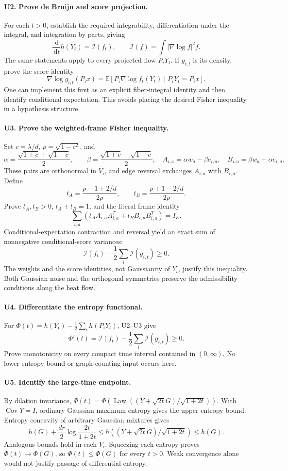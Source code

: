 \documentclass[11pt]{article}
\newcommand{\E}{\mathbb E}
\newcommand{\I}{\mathcal I}
\newcommand{\dd}{\,\mathrm d}
\newcommand{\Law}{\operatorname{Law}}
\newcommand{\Cov}{\operatorname{Cov}}
\begin{document}
\paragraph{U2. Prove de Bruijn and score projection.}
For each $t>0$, establish the required integrability, differentiation
under the integral, and integration by parts, giving
\[
 \frac{\dd}{\dd t}h(Y_t)=\I(f_t),\qquad
 \I(f)=\int|\nabla\log f|^2f.
\]
The same statements apply to every projected flow $P_iY_t$.
If $g_{i,t}$ is its density, prove the score identity
\[
 \nabla\log g_{i,t}(P_ix)
   =\E[P_i\nabla\log f_t(Y_t)\mid P_iY_t=P_ix].
\]
One can implement this first as an explicit fiber-integral identity and
then identify conditional expectation. This avoids placing the desired
Fisher inequality in a hypothesis structure.

\paragraph{U3. Prove the weighted-frame Fisher inequality.}
Set $c=\lambda/d$, $\rho=\sqrt{1-c^2}$, and
\[
 \alpha=\frac{\sqrt{1+c}+\sqrt{1-c}}2,\qquad
 \beta=\frac{\sqrt{1+c}-\sqrt{1-c}}2,
 \quad A_{i,a}=\alpha w_a-\beta e_{i,a},\quad
 B_{i,a}=\beta w_a+\alpha e_{i,a}.
\]
These pairs are orthonormal in $V_i$, and edge reversal exchanges $A_{i,a}$
with $B_{i,a}$. Define
\[
 t_A=\frac{\rho-1+2/d}{2\rho},\qquad
 t_B=\frac{\rho+1-2/d}{2\rho}.
\]
Prove $t_A,t_B>0$, $t_A+t_B=1$, and the literal frame identity
\[
 \sum_{i,a}(t_A A_{i,a}A_{i,a}^T+t_B B_{i,a}B_{i,a}^T)=I_E.
\]
Conditional-expectation contraction and reversal yield an exact sum of
nonnegative conditional-score variances:
\[
 \I(f_t)-\frac12\sum_i\I(g_{i,t})\geq0.
\]
The weights and the score identities, not Gaussianity of $Y_t$, justify
this inequality. Both Gaussian noise and the orthogonal symmetries preserve
the admissibility conditions along the heat flow.

\paragraph{U4. Differentiate the entropy functional.}
For
$\Phi(t)=h(Y_t)-\frac12\sum_i h(P_iY_t)$, U2--U3 give
\[
 \Phi'(t)=\I(f_t)-\frac12\sum_i\I(g_{i,t})\geq0.
\]
Prove monotonicity on every compact time interval contained in $(0,\infty)$.
No lower entropy bound or graph-counting input occurs here.

\paragraph{U5. Identify the large-time endpoint.}
By dilation invariance,
$\Phi(t)=\Phi(\Law((Y+\sqrt{2t}G)/\sqrt{1+2t}))$.
With $\Cov Y=I$, ordinary Gaussian maximum entropy gives the upper entropy
bound. Entropy concavity of arbitrary Gaussian mixtures gives
\[
 h(G)+\frac{dr}{2}\log\frac{2t}{1+2t}
 \leq h((Y+\sqrt{2t}G)/\sqrt{1+2t})\leq h(G).
\]
Analogous bounds hold in each $V_i$. Squeezing each entropy proves
$\Phi(t)\to\Phi(G)$, so $\Phi(t)\leq\Phi(G)$ for every $t>0$.
Weak convergence alone would not justify passage of differential entropy.
\end{document}
